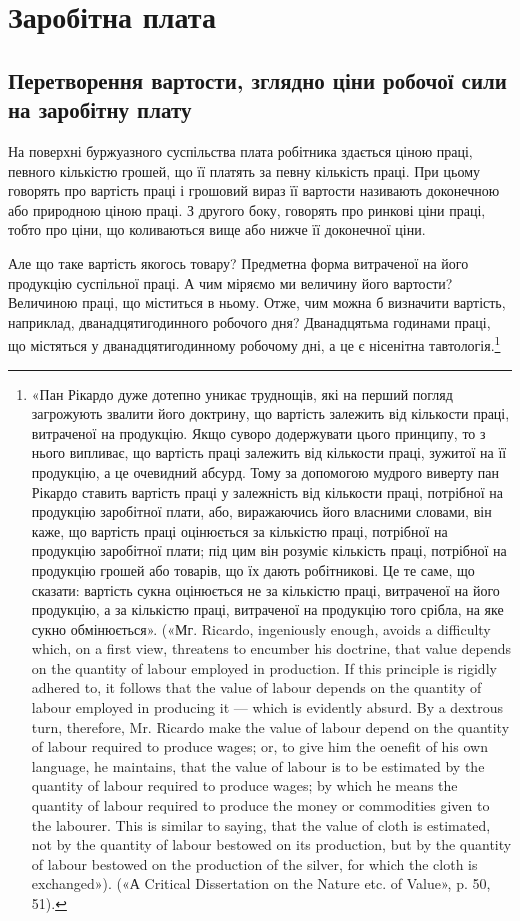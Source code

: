 \chapter{Заробітна плата}

\section{Перетворення вартости, зглядно ціни робочої
сили на заробітну плату}

На поверхні буржуазного суспільства плата робітника здається
ціною праці, певного кількістю грошей, що її платять за
певну кількість праці. При цьому говорять про вартість праці
і грошовий вираз її вартости називають доконечною або природною
ціною праці. З другого боку, говорять про ринкові ціни
праці, тобто про ціни, що коливаються вище або нижче її доконечної
ціни.

Але що таке вартість якогось товару? Предметна форма витраченої
на його продукцію суспільної праці. А чим міряємо
ми величину його вартости? Величиною праці, що міститься
в ньому. Отже, чим можна б визначити вартість, наприклад,
дванадцятигодинного робочого дня? Дванадцятьма годинами
праці, що містяться у дванадцятигодинному робочому дні, а це
є нісенітна тавтологія.\footnote{
«Пан Рікардо дуже дотепно уникає труднощів, які на перший
погляд загрожують звалити його доктрину, що вартість залежить від
кількости праці, витраченої на продукцію. Якщо суворо додержувати
цього принципу, то з нього випливає, що вартість праці залежить від
кількости праці, зужитої на її продукцію, а це очевидний абсурд. Тому
за допомогою мудрого виверту пан Рікардо ставить вартість праці у
залежність від кількости праці, потрібної на продукцію заробітної плати,
або, виражаючись його власними словами, він каже, що вартість праці
оцінюється за кількістю праці, потрібної на продукцію заробітної плати;
під цим він розуміє кількість праці, потрібної на продукцію грошей або
товарів, що їх дають робітникові. Це те саме, що сказати: вартість сукна
оцінюється не за кількістю праці, витраченої на його продукцію, а за
кількістю праці, витраченої на продукцію того срібла, на яке сукно
обмінюється». («Мг. Ricardo, ingeniously enough, avoids a difficulty
which, on a first view, threatens to encumber his doctrine, that value depends
on the quantity of labour employed in production. If this principle
is rigidly adhered to, it follows that the value of labour depends on the
quantity of labour employed in producing it — which is evidently absurd.
By a dextrous turn, therefore, Mr. Ricardo make the value of labour depend
on the quantity of labour required to produce wages; or, to give him the
oenefit of his own language, he maintains, that the value of labour is to
be estimated by the quantity of labour required to produce wages; by which
he means the quantity of labour required to produce the money or commodities
given to the labourer. This is similar to saying, that the value of cloth
is estimated, not by the quantity of labour bestowed on its production,
but by the quantity of labour bestowed on the production of the silver,
for which the cloth is exchanged»). («А Critical Dissertation on the Nature
etc. of Value», p. 50, 51).
}

